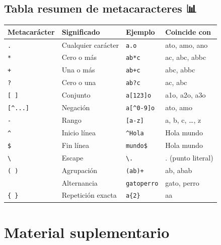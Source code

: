 \documentclass[
  spanish,
  12pt,
  letterpaper,
  DIV=11,
  numbers=noendperiod]{scrreprt}
\newcounter{none} %
\begin{document}
\subsection{Tabla resumen de metacaracteres
📊}\label{tabla-resumen-de-metacaracteres}

{\def\LTcaptype{none} %
\begin{longtable}[]{@{}llll@{}}
\toprule\noalign{}
Metacarácter & Significado & Ejemplo & Coincide con \\
\midrule\noalign{}
\endhead
\bottomrule\noalign{}
\endlastfoot
\texttt{.} & Cualquier carácter & \texttt{a.o} & ato, amo, ano \\
\texttt{*} & Cero o más & \texttt{ab*c} & ac, abc, abbc \\
\texttt{+} & Una o más & \texttt{ab+c} & abc, abbc \\
\texttt{?} & Cero o una & \texttt{ab?c} & ac, abc \\
\texttt{{[}\ {]}} & Conjunto & \texttt{a{[}123{]}o} & a1o, a2o, a3o \\
\texttt{{[}\^{}...{]}} & Negación & \texttt{a{[}\^{}0-9{]}o} & ato,
amo \\
\texttt{-} & Rango & \texttt{{[}a-z{]}} & a, b, c, \ldots, z \\
\texttt{\^{}} & Inicio línea & \texttt{\^{}Hola} & Hola mundo \\
\texttt{\$} & Fin línea & \texttt{mundo\$} & Hola mundo \\
\texttt{\textbackslash{}} & Escape & \texttt{\textbackslash{}.} & .
(punto literal) \\
\texttt{(\ )} & Agrupación & \texttt{(ab)+} & ab, abab \\
\texttt{\textbar{}} & Alternancia & \texttt{gato\textbar{}perro} & gato,
perro \\
\texttt{\{\ \}} & Repetición exacta & \texttt{a\{2\}} & aa \\
\end{longtable}
}

\section{Material suplementario}\label{material-suplementario-3}
\end{document}
